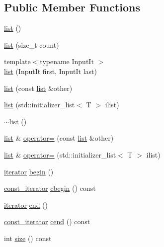 \subsection*{Public Member Functions}
\begin{DoxyCompactItemize}
\item 
\mbox{\hyperlink{classsc_1_1list_ac7b95807230114dc58f2b1156cb3cdba}{list}} ()
\item 
\mbox{\hyperlink{classsc_1_1list_a154e0a43ee70faa49f66f9ce4ce48583}{list}} (size\+\_\+t count)
\item 
{\footnotesize template$<$typename Input\+It $>$ }\\\mbox{\hyperlink{classsc_1_1list_a142545a98bc5fec38606bf7000620864}{list}} (Input\+It first, Input\+It last)
\item 
\mbox{\hyperlink{classsc_1_1list_a1fe5b60798e979cb0a5b1663d64ec69b}{list}} (const \mbox{\hyperlink{classsc_1_1list}{list}} \&other)
\item 
\mbox{\hyperlink{classsc_1_1list_ae85152bcf538c929944790b1c30d3b22}{list}} (std\+::initializer\+\_\+list$<$ T $>$ ilist)
\item 
\mbox{\hyperlink{classsc_1_1list_a72eaabb03a048506432f8d167db12524}{$\sim$list}} ()
\item 
\mbox{\hyperlink{classsc_1_1list}{list}} \& \mbox{\hyperlink{classsc_1_1list_a09a75038c91f224b930fc63b39c4ad56}{operator=}} (const \mbox{\hyperlink{classsc_1_1list}{list}} \&other)
\item 
\mbox{\hyperlink{classsc_1_1list}{list}} \& \mbox{\hyperlink{classsc_1_1list_a480d22198a20823cf386bc3caef22cae}{operator=}} (std\+::initializer\+\_\+list$<$ T $>$ ilist)
\item 
\mbox{\hyperlink{classsc_1_1list_1_1iterator}{iterator}} \mbox{\hyperlink{classsc_1_1list_a5f5e6470de04a47d530dae0c87403caa}{begin}} ()
\item 
\mbox{\hyperlink{classsc_1_1list_1_1const__iterator}{const\+\_\+iterator}} \mbox{\hyperlink{classsc_1_1list_aff238d93b985d8e0c340519c58e378cf}{cbegin}} () const
\item 
\mbox{\hyperlink{classsc_1_1list_1_1iterator}{iterator}} \mbox{\hyperlink{classsc_1_1list_a31c42556b18886277d436ec540019349}{end}} ()
\item 
\mbox{\hyperlink{classsc_1_1list_1_1const__iterator}{const\+\_\+iterator}} \mbox{\hyperlink{classsc_1_1list_a935b1947e028c0f733bbe14afd0fd38f}{cend}} () const
\item 
int \mbox{\hyperlink{classsc_1_1list_ae7dcc01498f6def3ffff29a35b36c2f3}{size}} () const

\end{DoxyCompactItemize}
